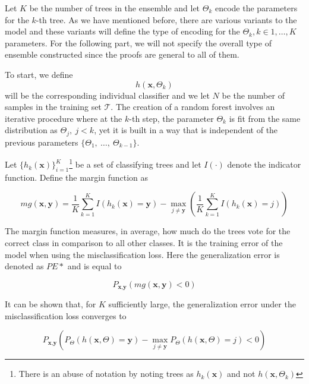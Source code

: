Let $K$ be the number of trees in the ensemble and let $\Theta_k$ encode the parameters for the $k$-th tree.
As we have mentioned before, there are various variants to the model and these variants will define the type of encoding for the $\Theta_k, k \in {1,\ldots,K}$  parameters.
For the following part, we will not specify the overall type of ensemble constructed since the  proofs are general to all of them.

To start, we define
$$h(\textbf{x},\Theta_k)$$ will be the corresponding individual classifier and we let $N$ be the number of samples in the training set $\mathcal{T}$.
The creation of a random forest involves an iterative procedure where at the $k$-th step, the parameter $\Theta_k$ is fit from the same distribution as $\Theta_j, \ j<k$, yet it is built in a way that is independent of the previous parameters $\{\Theta_1, \ \ldots, \ \Theta_{k-1} \}$. %


Let $\{ h_k(\textbf{x}) \}_{i=1}^K$\footnote{There is an abuse of notation by noting trees as $h_k(\textbf{x})$ and not $h(\textbf{x}, \Theta_k)$ } be a set of classifying trees and let $I(\cdot)$ denote the indicator function.
Define the margin function as

\begin{equation}
\label{eq:rf-marginFun}
mg(\textbf{x},\textbf{y}) = \frac{1}{K}  \sum_{k=1}^K I(h_k(\textbf{x}) = \textbf{y})
- \max_{j\neq \textbf{y}}\left(\frac{1}{K} \sum_{k=1}^K I(h_k(\textbf{x}) = j) \right)
\end{equation}


The margin function measures, in average, how much do the trees vote for the correct class in comparison to all other classes.
It is the training error of the model when using the misclassification loss.
Here the generalization error is denoted as $PE*$ and is equal to

\begin{equation}
P_{\textbf{x}, \textbf{y} }(mg(\textbf{x},\textbf{y}) <0)
\end{equation}

 It can be shown that, for $K$ sufficiently large, the generalization error under the misclassification loss converges to

\begin{equation}
 P_{\textbf{x}, \textbf{y} } ( P_{\Theta} (h(\textbf{x}, \Theta) = \textbf{y}) - \max_{j \neq \textbf{y}} P_{\Theta} (h(\textbf{x}, \Theta) = j) < 0)
 \end{equation}

